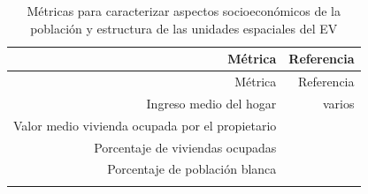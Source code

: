 \documentclass[12pt,]{book}
\begin{document}
\begin{longtable}[]{@{}rr@{}}
\caption{\label{tab:ind-SoEc} Métricas para caracterizar aspectos
socioeconómicos de la población y estructura de las unidades espaciales
del EV}\tabularnewline
\toprule
\begin{minipage}[b]{0.57\columnwidth}\raggedleft\strut
Métrica\strut
\end{minipage} & \begin{minipage}[b]{0.31\columnwidth}\raggedleft\strut
Referencia\strut
\end{minipage}\tabularnewline
\midrule
\endfirsthead
\toprule
\begin{minipage}[b]{0.57\columnwidth}\raggedleft\strut
Métrica\strut
\end{minipage} & \begin{minipage}[b]{0.31\columnwidth}\raggedleft\strut
Referencia\strut
\end{minipage}\tabularnewline
\midrule
\endhead
\begin{minipage}[t]{0.57\columnwidth}\raggedleft\strut
Ingreso medio del hogar\strut
\end{minipage} & \begin{minipage}[t]{0.31\columnwidth}\raggedleft\strut
varios\strut
\end{minipage}\tabularnewline
\begin{minipage}[t]{0.57\columnwidth}\raggedleft\strut
Valor medio vivienda ocupada por el propietario\strut
\end{minipage} & \begin{minipage}[t]{0.31\columnwidth}\raggedleft\strut
\citep{cowett_methodology_2014}\strut
\end{minipage}\tabularnewline
\begin{minipage}[t]{0.57\columnwidth}\raggedleft\strut
Porcentaje de viviendas ocupadas\strut
\end{minipage} & \begin{minipage}[t]{0.31\columnwidth}\raggedleft\strut
\citep{cowett_methodology_2014}\strut
\end{minipage}\tabularnewline
\begin{minipage}[t]{0.57\columnwidth}\raggedleft\strut
Porcentaje de población blanca\strut
\end{minipage} & \begin{minipage}[t]{0.31\columnwidth}\raggedleft\strut
\citep{cowett_methodology_2014}\strut
\end{minipage}\tabularnewline
\begin{minipage}[t]{0.57\columnwidth}\raggedleft\strut

\end{minipage}
\end{longtable}
\end{document}

